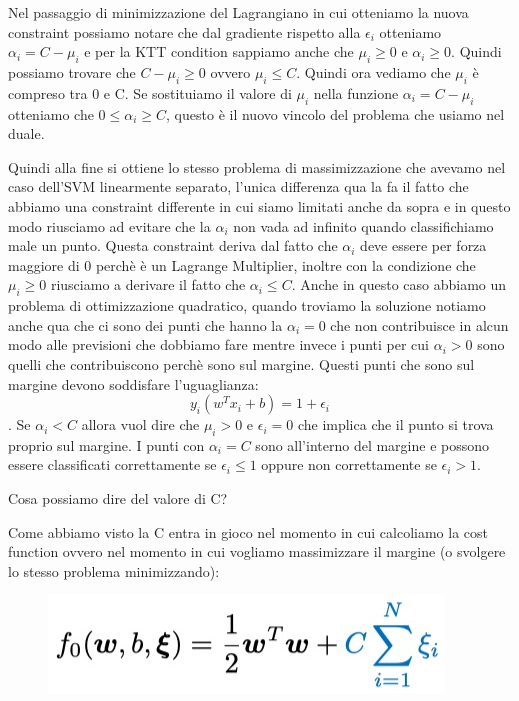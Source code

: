 \documentclass[14pt]{extreport}
\begin{document}
Nel passaggio di minimizzazione del Lagrangiano in cui otteniamo la nuova constraint possiamo notare che dal gradiente rispetto alla $\epsilon_i$
otteniamo $\alpha_i = C - \mu_i$ e per la KTT condition sappiamo anche che $\mu_i \geq 0$ e $\alpha_i \geq 0$. Quindi possiamo trovare che $C-\mu_i
\geq 0 $ ovvero $\mu_i \leq C$. Quindi ora vediamo che $\mu_i$ è compreso tra 0 e C. Se sostituiamo il valore di $\mu_i$ nella funzione $\alpha_i = C
- \mu_i$ otteniamo che $0 \leq \alpha_i \geq C$, questo è il nuovo vincolo del problema che usiamo nel duale.


Quindi alla fine si ottiene lo stesso problema di massimizzazione che avevamo nel caso dell'SVM linearmente separato, l'unica differenza qua la fa il
fatto che abbiamo una constraint differente in cui siamo limitati anche da sopra e in questo modo riusciamo ad evitare che la $\alpha_i$ non vada ad
infinito quando classifichiamo male un punto. Questa constraint deriva dal fatto che $\alpha_i$ deve essere per forza maggiore di 0 perchè è un
Lagrange Multiplier, inoltre con la condizione che $\mu_i \geq 0$ riusciamo a derivare il fatto che $\alpha_i \leq C$. Anche in questo caso abbiamo un
problema di ottimizzazione quadratico, quando troviamo la soluzione notiamo anche qua che ci sono dei punti che hanno la $\alpha_i = 0$ che non
contribuisce in alcun modo alle previsioni che dobbiamo fare mentre invece i punti per cui $\alpha_i > 0$ sono quelli che contribuiscono perchè sono
sul margine. Questi punti che sono sul margine devono soddisfare l'uguaglianza:
$$y_i(w^Tx_i+b)=1+\epsilon_i$$. Se $\alpha_i < C$ allora vuol dire che $\mu_i > 0$ e $\epsilon_i = 0$ che implica che il punto si trova proprio sul
margine. I punti con $\alpha_i=C$ sono all'interno del margine e possono essere classificati correttamente se $\epsilon_i \leq 1$ oppure non
correttamente se $\epsilon_i > 1$.

Cosa possiamo dire del valore di C?


Come abbiamo visto la C entra in gioco nel momento in cui calcoliamo la cost function ovvero nel momento in cui vogliamo massimizzare il margine (o
svolgere lo stesso problema minimizzando):

\begin{figure}[H]
\centering
\includegraphics[width=0.5\linewidth]{325.jpeg}
\end{figure}
\end{document}
